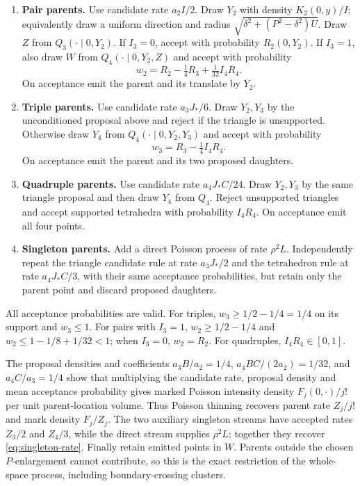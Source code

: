 \begin{enumerate}[label=\arabic*.]
\item \textbf{Pair parents.} Use candidate rate $a_2I/2$. Draw $Y_2$ with density $K_2(0,y)/I$; equivalently draw a uniform direction and radius $\sqrt{\delta^2+(P^2-\delta^2)U}$. Draw $Z$ from $Q_3(\cdot\mid0,Y_2)$. If $I_3=0$, accept with probability $R_2(0,Y_2)$. If $I_3=1$, also draw $W$ from $Q_4(\cdot\mid0,Y_2,Z)$ and accept with probability
\[
 w_2=R_2-\tfrac14R_3+\tfrac1{32}I_4R_4.
\]
On acceptance emit the parent and its translate by $Y_2$.

\item \textbf{Triple parents.} Use candidate rate $a_3J_*/6$. Draw $Y_2,Y_3$ by the unconditioned proposal above and reject if the triangle is unsupported. Otherwise draw $Y_4$ from $Q_4(\cdot\mid0,Y_2,Y_3)$ and accept with probability
\[
 w_3=R_3-\tfrac14I_4R_4.
\]
On acceptance emit the parent and its two proposed daughters.

\item \textbf{Quadruple parents.} Use candidate rate $a_4J_*C/24$. Draw $Y_2,Y_3$ by the same triangle proposal and then draw $Y_4$ from $Q_4$. Reject unsupported triangles and accept supported tetrahedra with probability $I_4R_4$. On acceptance emit all four points.

\item \textbf{Singleton parents.} Add a direct Poisson process of rate $\rho^2L$. Independently repeat the triangle candidate rule at rate $a_3J_*/2$ and the tetrahedron rule at rate $a_4J_*C/3$, with their same acceptance probabilities, but retain only the parent point and discard proposed daughters.
\end{enumerate}

All acceptance probabilities are valid. For triples, $w_3\geq1/2-1/4=1/4$ on its support and $w_3\leq1$. For pairs with $I_3=1$, $w_2\geq1/2-1/4$ and $w_2\leq1-1/8+1/32<1$; when $I_3=0$, $w_2=R_2$. For quadruples, $I_4R_4\in[0,1]$.

The proposal densities and coefficients $a_3B/a_2=1/4$, $a_4BC/(2a_2)=1/32$, and $a_4C/a_3=1/4$ show that multiplying the candidate rate, proposal density and mean acceptance probability gives marked Poisson intensity density $F_j(0,\cdot)/j!$ per unit parent-location volume. Thus Poisson thinning recovers parent rate $Z_j/j!$ and mark density $F_j/Z_j$. The two auxiliary singleton streams have accepted rates $Z_3/2$ and $Z_4/3$, while the direct stream supplies $\rho^2L$; together they recover \eqref{eq:singleton-rate}. Finally retain emitted points in $W$. Parents outside the chosen $P$-enlargement cannot contribute, so this is the exact restriction of the whole-space process, including boundary-crossing clusters.
